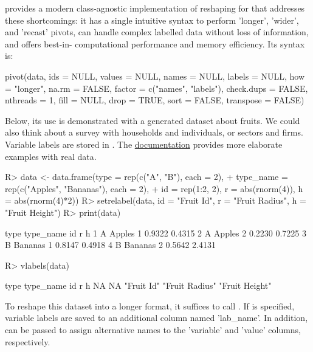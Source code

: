 \documentclass[article]{jss}
\begin{document}
 provides a modern class-agnostic implementation of reshaping for  that addresses these shortcomings: it has a single intuitive syntax to perform 'longer', 'wider', and 'recast' pivots, can handle complex labelled data without loss of information, and offers best-in- computational performance and memory efficiency. Its syntax is:
%
\begin{Code}
pivot(data, ids = NULL, values = NULL, names = NULL, labels = NULL,
      how = "longer", na.rm = FALSE, factor = c("names", "labels"),
      check.dups = FALSE, nthreads = 1, fill = NULL, drop = TRUE,
      sort = FALSE, transpose = FALSE)
\end{Code}
%
Below, its use is demonstrated with a generated dataset about fruits. We could also think about a survey with households and individuals, or sectors and firms. Variable labels are stored in . The \href{https://sebkrantz.github.io/collapse/reference/pivot.html#ref-examples}{documentation} provides more elaborate examples with real data.
%
\begin{Schunk}
\begin{Sinput}
R> data <- data.frame(type = rep(c("A", "B"), each = 2),
+              type_name = rep(c("Apples", "Bananas"), each = 2),
+              id = rep(1:2, 2), r = abs(rnorm(4)), h = abs(rnorm(4)*2))
R> setrelabel(data, id = "Fruit Id", r = "Fruit Radius", h = "Fruit Height")
R> print(data)
\end{Sinput}
\begin{Soutput}
  type type_name id      r      h
1    A    Apples  1 0.9322 0.4315
2    A    Apples  2 0.2230 0.7225
3    B   Bananas  1 0.8147 0.4918
4    B   Bananas  2 0.5642 2.4131
\end{Soutput}
\begin{Sinput}
R> vlabels(data)
\end{Sinput}
\begin{Soutput}
          type      type_name             id              r              h 
            NA             NA     "Fruit Id" "Fruit Radius" "Fruit Height" 
\end{Soutput}
\end{Schunk}
%
To reshape this dataset into a longer format, it suffices to call . If  is specified, variable labels are saved to an additional column named 'lab\_name'. In addition,  can be passed to assign alternative names to the 'variable' and 'value' columns, respectively.
\end{document}
